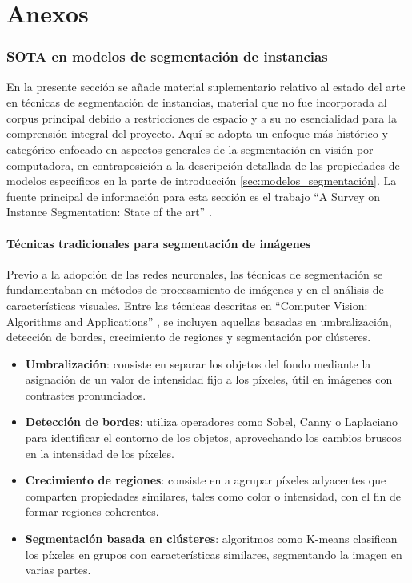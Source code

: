 \part*{Anexos}
\label{part:anexo}
\section[SOTA en modelos de segmentación de instancias]{SOTA en modelos de segmentación de instancias}
\label{sec:anexo_sota_segmentacion}
En la presente sección se añade material suplementario relativo al estado del arte en técnicas de segmentación de instancias, material que no fue incorporada al corpus principal debido a restricciones de espacio y a su no esencialidad para la comprensión integral del proyecto. Aquí se adopta un enfoque más histórico y categórico enfocado en aspectos generales de la segmentación en visión por computadora, en contraposición a la descripción detallada de las propiedades de modelos específicos en la parte de introducción \ref{sec:modelos_segmentación}. La fuente principal de información para esta sección es el trabajo \enquote{A Survey on Instance Segmentation: State of the art} \cite[Hafiz y Bhat 2020]{Hafiz2020}.

\subsection{Técnicas tradicionales para segmentación de imágenes}
Previo a la adopción de las redes neuronales, las técnicas de segmentación se fundamentaban en métodos de procesamiento de imágenes y en el análisis de características visuales. Entre las técnicas descritas en \enquote{Computer Vision: Algorithms and Applications} \cite[Szeliski 2022]{Szeliski2022}, se incluyen aquellas basadas en umbralización, detección de bordes, crecimiento de regiones y segmentación por clústeres.

\begin{itemize}
\setlength\itemsep{-0.3em}
    \item \textbf{Umbralización}: consiste en separar los objetos del fondo mediante la asignación de un valor de intensidad fijo a los píxeles, útil en imágenes con contrastes pronunciados.
    \item \textbf{Detección de bordes}: utiliza operadores como Sobel, Canny o Laplaciano para identificar el contorno de los objetos, aprovechando los cambios bruscos en la intensidad de los píxeles.
    \item \textbf{Crecimiento de regiones}: consiste en a agrupar píxeles adyacentes que comparten propiedades similares, tales como color o intensidad, con el fin de formar regiones coherentes.
    \item \textbf{Segmentación basada en clústeres}: algoritmos como K-means clasifican los píxeles en grupos con características similares, segmentando la imagen en varias partes.
\end{itemize}

